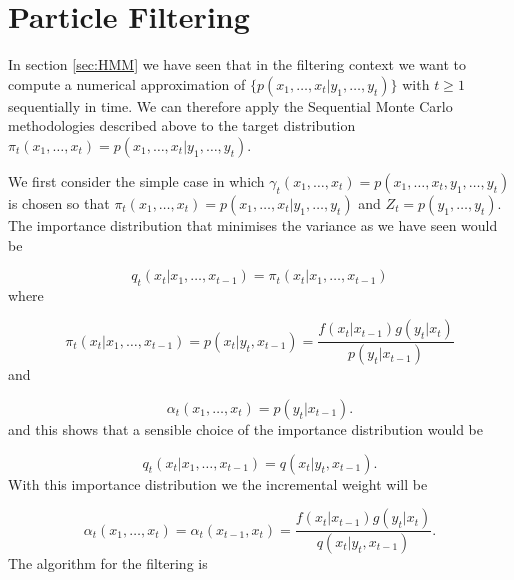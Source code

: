 \section{Particle Filtering} \label{sec:PF}

In section \ref{sec:HMM} we have seen that in the filtering context we want to compute a numerical approximation of $\{ p(x_1, \dots, x_t | y_1, \dots, y_t) \}$ with $t \geq 1$ sequentially in time. We can therefore apply the Sequential Monte Carlo methodologies described above to the target distribution $\pi_t(x_1, \dots, x_t) = p(x_1, \dots, x_t | y_1, \dots, y_t)$.

We first consider the simple case in which $\gamma_t (x_1, \dots, x_t) =  p(x_1, \dots, x_t , y_1, \dots, y_t)$ is chosen so that $\pi_t (x_1, \dots, x_t) = p(x_1, \dots, x_t | y_1, \dots, y_t)$ and $Z_t = p( y_1, \dots, y_t)$. The importance distribution that minimises the variance as we have seen would be

\begin{equation*}
    q_t( x_t | x_1, \dots, x_{t-1}) = \pi_t( x_t | x_1, \dots, x_{t-1})
\end{equation*}
where 

\begin{equation*}
    \pi_t( x_t | x_1, \dots, x_{t-1}) = p(x_t | y_t, x_{t-1}) = \frac{f(x_t | x_{t-1})g(y_t | x_t)}{p(y_t | x_{t-1})}
\end{equation*}
and

\begin{equation*}
    \alpha_t(x_1, \dots, x_t) = p(y_t | x_{t-1}).
\end{equation*}
and this shows that a sensible choice of the importance distribution would be 

\begin{equation*}
    q_t( x_t | x_1, \dots, x_{t-1}) = q(x_t | y_t, x_{t-1}).
\end{equation*}
With this importance distribution we the incremental weight will be

\begin{equation*}
    \alpha_t(x_1, \dots, x_t) = \alpha_t(x_{t-1}, x_t) = \frac{f(x_t | x_{t-1})g(y_t | x_t)}{q(x_t | y_t, x_{t-1})}.
\end{equation*}
The algorithm for the filtering is

